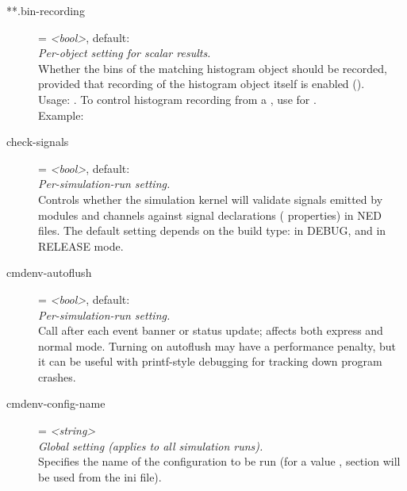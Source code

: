 \begin{description}
\item[**.bin-recording] = \textit{<bool>}, default: \\
    \textit{Per-object setting for scalar results.}\\
    Whether the bins of the matching histogram object should be recorded,
    provided that recording of the histogram object itself is enabled
    ().\\Usage:
    .
    To control histogram recording from a , use
     for
    .\\Example:
\item[check-signals] = \textit{<bool>}, default: \\
    \textit{Per-simulation-run setting.}\\
    Controls whether the simulation kernel will validate signals emitted by
    modules and channels against signal declarations
    ( properties) in NED files. The default setting
    depends on the build type:  in DEBUG, and  in RELEASE
    mode.
\item[cmdenv-autoflush] = \textit{<bool>}, default: \\
    \textit{Per-simulation-run setting.}\\
    Call  after each event banner or status update; affects
    both express and normal mode. Turning on autoflush may have a performance
    penalty, but it can be useful with printf-style debugging for tracking down
    program crashes.
\item[cmdenv-config-name] = \textit{<string>}\\
    \textit{Global setting (applies to all simulation runs).}\\
    Specifies the name of the configuration to be run (for a value ,
    section  will be used from the ini file).

\end{description}

